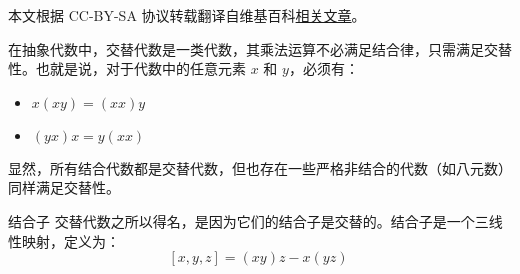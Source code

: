 
本文根据 CC-BY-SA 协议转载翻译自维基百科\href{https://en.wikipedia.org/wiki/Alternative_algebra}{相关文章}。


在抽象代数中，交替代数是一类代数，其乘法运算不必满足结合律，只需满足交替性。也就是说，对于代数中的任意元素 $x$ 和 $y$，必须有：
\begin{itemize}
\item $x(xy) = (xx)y$
\item $(yx)x = y(xx)$
\end{itemize}
显然，所有结合代数都是交替代数，但也存在一些严格非结合的代数（如八元数）同样满足交替性。

结合子
交替代数之所以得名，是因为它们的结合子是交替的。结合子是一个三线性映射，定义为：
$$
[x, y, z] = (xy)z - x(yz)~
$$
